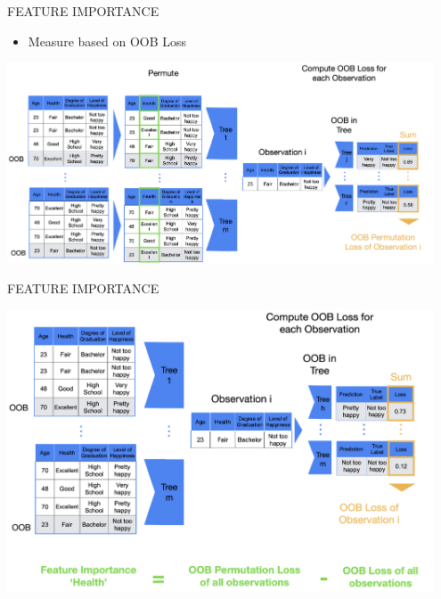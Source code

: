 \documentclass[11pt,compress,t,notes=noshow, xcolor=table]{beamer}
\begin{document}
\begin{vbframe}{FEATURE IMPORTANCE}

 \begin{itemize}
        \item \small Measure based on OOB Loss
    \end{itemize}

\begin{center}
    \includegraphics[width = 0.95\textwidth]{figure_man/nutshell-randomforest-OOB_1.png}
\end{center}


\end{vbframe}



\begin{vbframe}{FEATURE IMPORTANCE}
\begin{center}
    \includegraphics[width = 0.95\textwidth]{figure_man/nutshell-randomforest-OOB_2.png}
\end{center}


\end{vbframe}




\endlecture
\end{document}
